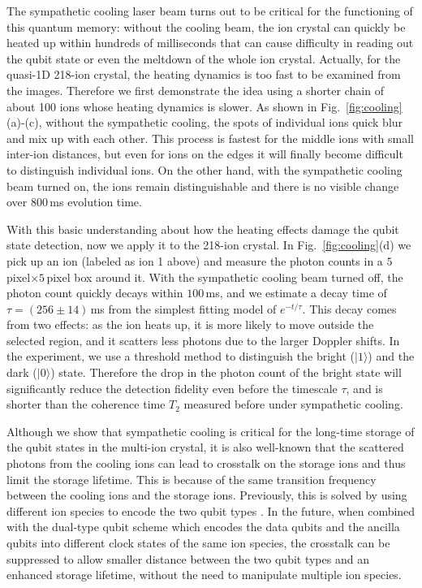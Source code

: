\documentclass[aps,prl,reprint,superscriptaddress,twocolumn,longbibliography]{revtex4-1}
\begin{document}
The sympathetic cooling laser beam turns out to be critical for the functioning of this quantum memory: without the cooling beam, the ion crystal can quickly be heated up within hundreds of milliseconds that can cause difficulty in reading out the qubit state or even the meltdown of the whole ion crystal. Actually, for the quasi-1D 218-ion crystal, the heating dynamics is too fast to be examined from the images. Therefore we first demonstrate the idea using a shorter chain of about 100 ions whose heating dynamics is slower. As shown in Fig.~\ref{fig:cooling}(a)-(c), without the sympathetic cooling, the spots of individual ions quick blur and mix up with each other. This process is fastest for the middle ions with small inter-ion distances, but even for ions on the edges it will finally become difficult to distinguish individual ions. On the other hand, with the sympathetic cooling beam turned on, the ions remain distinguishable and there is no visible change over $800\,$ms evolution time.

With this basic understanding about how the heating effects damage the qubit state detection, now we apply it to the 218-ion crystal. In Fig.~\ref{fig:cooling}(d) we pick up an ion (labeled as ion 1 above) and measure the photon counts in a $5\,$pixel$\times5\,$pixel box around it. With the sympathetic cooling beam turned off, the photon count quickly decays within $100\,$ms, and we estimate a decay time of $\tau=(256\pm14)\,$ms from the simplest fitting model of $e^{-t/\tau}$. This decay comes from two effects: as the ion heats up, it is more likely to move outside the selected region, and it scatters less photons due to the larger Doppler shifts. In the experiment, we use a threshold method to distinguish the bright ($|1\rangle$) and the dark ($|0\rangle$) state. Therefore the drop in the photon count of the bright state will significantly reduce the detection fidelity even before the timescale $\tau$, and is shorter than the coherence time $T_2$ measured before under sympathetic cooling.

Although we show that sympathetic cooling is critical for the long-time storage of the qubit states in the multi-ion crystal, it is also well-known that the scattered photons from the cooling ions can lead to crosstalk on the storage ions and thus limit the storage lifetime. This is because of the same transition frequency between the cooling ions and the storage ions. Previously, this is solved by using different ion species to encode the two qubit types \cite{wang2021single,PhysRevLett.118.053002,PhysRevA.65.040304,PhysRevA.68.042302,PhysRevA.79.050305}. In the future, when combined with the dual-type qubit scheme \cite{yang2022realizing} which encodes the data qubits and the ancilla qubits into different clock states of the same ion species, the crosstalk can be suppressed to allow smaller distance between the two qubit types and an enhanced storage lifetime, without the need to manipulate multiple ion species.
\end{document}
